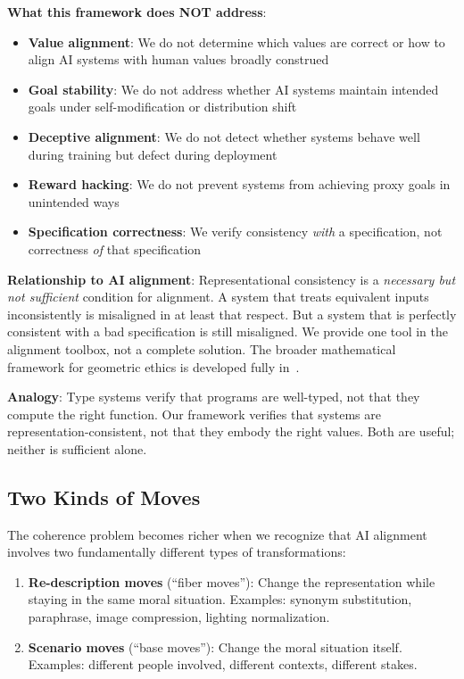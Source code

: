 \documentclass[12pt]{article}
\begin{document}
\textbf{What this framework does NOT address}:
\begin{itemize}
    \item \textbf{Value alignment}: We do not determine which values are correct or how to align AI systems with human values broadly construed
    \item \textbf{Goal stability}: We do not address whether AI systems maintain intended goals under self-modification or distribution shift
    \item \textbf{Deceptive alignment}: We do not detect whether systems behave well during training but defect during deployment
    \item \textbf{Reward hacking}: We do not prevent systems from achieving proxy goals in unintended ways
    \item \textbf{Specification correctness}: We verify consistency \emph{with} a specification, not correctness \emph{of} that specification
\end{itemize}

\textbf{Relationship to AI alignment}: Representational consistency is a \emph{necessary but not sufficient} condition for alignment. A system that treats equivalent inputs inconsistently is misaligned in at least that respect. But a system that is perfectly consistent with a bad specification is still misaligned. We provide one tool in the alignment toolbox, not a complete solution. The broader mathematical framework for geometric ethics is developed fully in~\cite{bond2026ge}.

\textbf{Analogy}: Type systems verify that programs are well-typed, not that they compute the right function. Our framework verifies that systems are representation-consistent, not that they embody the right values. Both are useful; neither is sufficient alone.

\subsection{Two Kinds of Moves}

The coherence problem becomes richer when we recognize that AI alignment involves two fundamentally different types of transformations:

\begin{enumerate}
    \item \textbf{Re-description moves} (``fiber moves''): Change the representation while staying in the same moral situation. Examples: synonym substitution, paraphrase, image compression, lighting normalization.
    \item \textbf{Scenario moves} (``base moves''): Change the moral situation itself. Examples: different people involved, different contexts, different stakes.
\end{enumerate}
\end{document}
